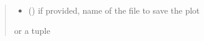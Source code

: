 \documentclass[letterpaper,10pt,english]{sphinxmanual}
\begin{document}
\begin{fulllineitems}
\begin{fulllineitems}
\begin{quote}
\begin{description}
\begin{itemize}
\item {} 
\sphinxAtStartPar
{} () \textendash{} if provided, name of the file to save the plot

\end{itemize}

\sphinxAtStartPar
{} or a tuple 

\end{description}\end{quote}

\end{fulllineitems}


\end{fulllineitems}

\end{document}
